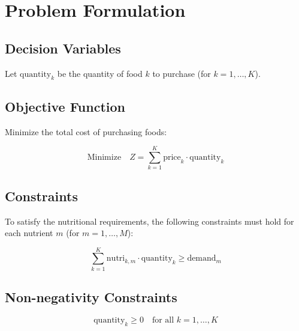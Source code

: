 \documentclass{article}
\begin{document}
\section*{Problem Formulation}

\subsection*{Decision Variables}
Let \( \text{quantity}_k \) be the quantity of food \( k \) to purchase (for \( k = 1, \ldots, K \)).

\subsection*{Objective Function}
Minimize the total cost of purchasing foods:

\[
\text{Minimize} \quad Z = \sum_{k=1}^{K} \text{price}_k \cdot \text{quantity}_k
\]

\subsection*{Constraints}
To satisfy the nutritional requirements, the following constraints must hold for each nutrient \( m \) (for \( m = 1, \ldots, M \)):

\[
\sum_{k=1}^{K} \text{nutri}_{k,m} \cdot \text{quantity}_k \geq \text{demand}_m
\]

\subsection*{Non-negativity Constraints}

\[
\text{quantity}_k \geq 0 \quad \text{for all } k = 1, \ldots, K
\]
\end{document}
